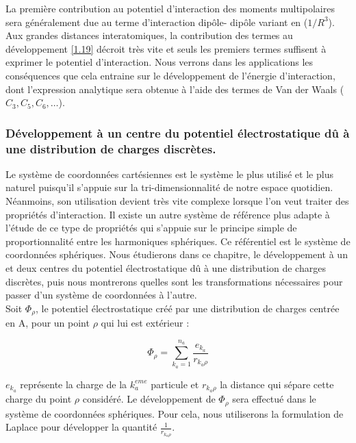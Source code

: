 La première contribution au potentiel d'interaction des moments multipolaires sera généralement due au terme d'interaction dipôle- dipôle variant en ($1/R^{3}$). Aux grandes distances interatomiques, la contribution des termes au développement \ref{1.19} décroit très vite et seuls les premiers termes suffisent à exprimer le potentiel d'interaction. Nous verrons dans les applications les conséquences que cela entraine sur le développement de l'énergie d'interaction, dont l'expression analytique sera obtenue à l'aide des termes de Van der Waals ($C_{3}, C_{5}, C_{6}, \ldots$).\\


\subsubsection{Développement à un centre du potentiel électrostatique dû à une distribution de charges discrètes.}

Le système de coordonnées cartésiennes est le système le plus utilisé et le plus naturel puisqu'il s'appuie sur la tri-dimensionnalité de notre espace quotidien. Néanmoins, son utilisation devient très vite complexe lorsque l'on veut traiter des propriétés d'interaction. Il existe un autre système de référence plus adapte à l'étude de ce type de propriétés qui s'appuie sur le principe simple de proportionnalité entre les harmoniques sphériques. Ce référentiel est le système de coordonnées sphériques. Nous étudierons dans ce chapitre, le développement à un et deux centres du potentiel électrostatique dû à une distribution de charges discrètes, puis nous montrerons quelles sont les transformations nécessaires pour passer d'un système de coordonnées à l'autre.\\

Soit $\Phi_{\rho}$, le potentiel électrostatique créé par une distribution de charges centrée en A, pour un point $\rho$ qui lui est extérieur : 
	
\begin{equation}
\Phi_{\rho} = \sum_{k_{a}=1}^{n_{a}} \frac{e_{k_{a}}}{r_{k_{a}\rho}} \label{1.20}
\end{equation}
	
$e_{k_{a}}$ représente la charge de la $k_{a}^{eme}$ particule et $r_{k_{a}\rho}$ la distance qui sépare cette charge du point $\rho$ considéré. Le développement de $\Phi_{\rho}$ sera effectué dans le système de coordonnées sphériques. Pour cela, nous utiliserons la formulation de Laplace pour développer la quantité $\frac{1}{r_{k_{a}\rho}}$.
	
